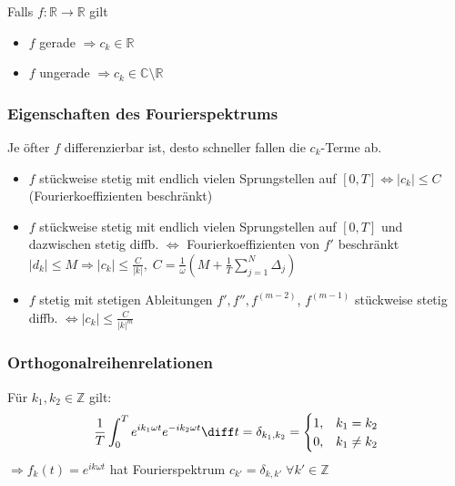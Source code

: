 \begin{sectionbox}
    Falls $f:\mathbb R \rightarrow \mathbb R$ gilt
    \begin{itemize}
        \item $f$ gerade $\Rightarrow c_k\in\mathbb R$
        \item $f$ ungerade $\Rightarrow c_k\in\mathbb C\setminus\mathbb R$
    \end{itemize}
\end{sectionbox}

\begin{sectionbox}
    \subsubsection{Eigenschaften des Fourierspektrums}
    Je öfter $f$ differenzierbar ist, desto schneller fallen die $c_k$-Terme ab.
    \begin{itemize}
        \item $f$ stückweise stetig mit endlich vielen Sprungstellen auf $[0,T] \Leftrightarrow |c_k| \le C$ (Fourierkoeffizienten beschränkt)
        \item $f$ stückweise stetig mit endlich vielen Sprungstellen auf $[0,T]$ und dazwischen stetig diffb. $\Leftrightarrow$ Fourierkoeffizienten von $f'$ beschränkt $|d_k| \le M \Rightarrow |c_k| \le \frac{C}{|k|}, \; C = \frac{1}{\omega}(M + \frac{1}{T}\sum_{j=1}^{N}\Delta_j)$
        \item $f$ stetig mit stetigen Ableitungen $f', f'', f^{(m-2)}$, $f^{(m-1)}$ stückweise stetig diffb. $\Leftrightarrow |c_k| \le \frac{C}{|k|^m}$
    \end{itemize}
\end{sectionbox}

\begin{sectionbox}
    \subsubsection{Orthogonalreihenrelationen}
    Für $k_1, k_2 \in \mathbb Z$ gilt:
    \begin{equation*}
        \frac{1}{T}\int_0^Te^{ik_1\omega t}e^{-ik_2\omega t}\diff t = \delta_{k_1,k_2}=\begin{cases}
            1, & k_1=k_2    \\
            0, & k_1\ne k_2
        \end{cases}
    \end{equation*}
    $\Rightarrow f_k(t)=e^{ik\omega t}$ hat Fourierspektrum $c_{k'}=\delta_{k,k'} \; \forall k' \in \mathbb Z$
\end{sectionbox}



